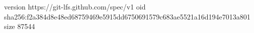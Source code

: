 version https://git-lfs.github.com/spec/v1
oid sha256:f2a384d8e48ed68759469e5915dd6750691579c683ae5521a16d194e7013a801
size 87544
